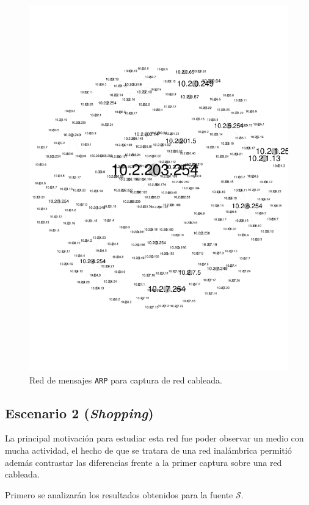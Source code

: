 \begin{figure}[H]
    \includegraphics[scale=0.4]{figures/wired_lan.pdf}
    \caption{Red de mensajes \texttt{ARP} para captura de red cableada.}
\end{figure}




\subsection{Escenario 2 (\emph{Shopping})}

La principal motivación para estudiar esta red fue poder observar un medio con
mucha actividad, el hecho de que se tratara de una red inalámbrica permitió además
contrastar las diferencias frente a la primer captura sobre una red cableada.

Primero se analizarán los resultados obtenidos para la fuente $\mathcal{S}$.

